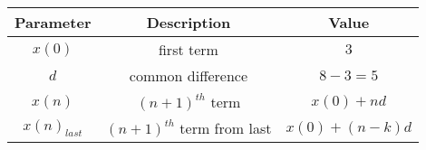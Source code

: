 \begin{tabular}{|c|c|c|}
        \hline
        \textbf{Parameter} & \textbf{Description} & \textbf{Value} \\
        \hline
        $x(0)$ & first term  & $3$ \\
         \hline
        $d$ & common difference & $8 - 3 = 5$ \\
        \hline
        $x(n)$ & $(n+1)^{th}$ term&$x(0) + nd$\\
        \hline
        $x(n)_{last}$&$(n+1)^{th}$ term from last & $x(0)+(n-k)d$\\
        \hline
    \end{tabular}
